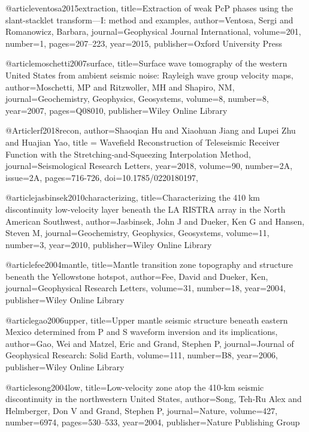 @article{ventosa2015extraction,
  title={Extraction of weak PcP phases using the slant-stacklet transform—I: method and examples},
  author={Ventosa, Sergi and Romanowicz, Barbara},
  journal={Geophysical Journal International},
  volume={201},
  number={1},
  pages={207--223},
  year={2015},
  publisher={Oxford University Press}
}

@article{moschetti2007surface,
  title={Surface wave tomography of the western United States from ambient seismic noise: Rayleigh wave group velocity maps},
  author={Moschetti, MP and Ritzwoller, MH and Shapiro, NM},
  journal={Geochemistry, Geophysics, Geosystems},
  volume={8},
  number={8},
  year={2007},
  pages={Q08010},
  publisher={Wiley Online Library}
}

@Article{rf2018recon,
  author={Shaoqian Hu and Xiaohuan Jiang and Lupei Zhu and Huajian Yao},
  title = {Wavefield Reconstruction of Teleseismic Receiver Function with the Stretching‐and‐Squeezing Interpolation Method},
  journal={Seismological Research Letters},
  year=2018,
  volume=90,
  number=2A,
  issue=2A,
  pages={716-726},
  doi={10.1785/0220180197},
}

@article{jasbinsek2010characterizing,
  title={Characterizing the 410 km discontinuity low-velocity layer beneath the LA RISTRA array in the North American Southwest},
  author={Jasbinsek, John J and Dueker, Ken G and Hansen, Steven M},
  journal={Geochemistry, Geophysics, Geosystems},
  volume={11},
  number={3},
  year={2010},
  publisher={Wiley Online Library}
}

@article{fee2004mantle,
  title={Mantle transition zone topography and structure beneath the Yellowstone hotspot},
  author={Fee, David and Dueker, Ken},
  journal={Geophysical Research Letters},
  volume={31},
  number={18},
  year={2004},
  publisher={Wiley Online Library}
}

@article{gao2006upper,
  title={Upper mantle seismic structure beneath eastern Mexico determined from P and S waveform inversion and its implications},
  author={Gao, Wei and Matzel, Eric and Grand, Stephen P},
  journal={Journal of Geophysical Research: Solid Earth},
  volume={111},
  number={B8},
  year={2006},
  publisher={Wiley Online Library}
}

@article{song2004low,
  title={Low-velocity zone atop the 410-km seismic discontinuity in the northwestern United States},
  author={Song, Teh-Ru Alex and Helmberger, Don V and Grand, Stephen P},
  journal={Nature},
  volume={427},
  number={6974},
  pages={530--533},
  year={2004},
  publisher={Nature Publishing Group}
}

